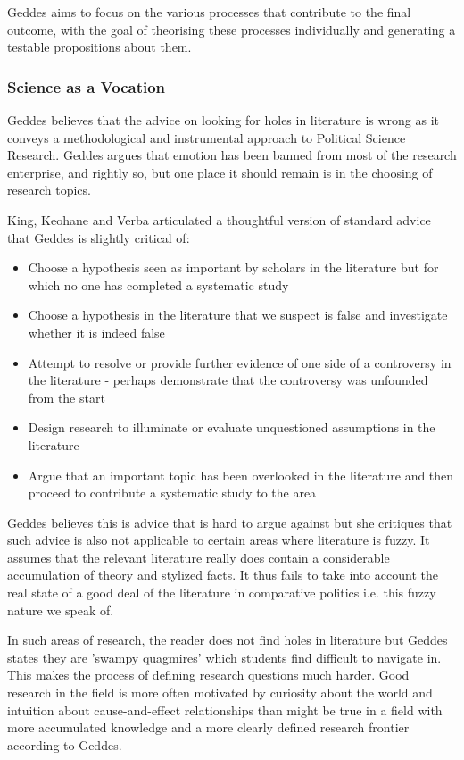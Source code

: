 \documentclass[12pt, letterpaper]{article}
\begin{document}
{\vspace{10pt}
\noindent Geddes aims to focus on the various processes that contribute to the final outcome, with the goal of theorising these processes individually and generating a testable propositions about them.

\subsubsection{Science as a Vocation}
Geddes believes that the advice on looking for holes in literature is wrong as it conveys a methodological and instrumental approach to Political Science Research. Geddes argues that emotion has been banned from most of the research enterprise, and rightly so, but one place it should remain is in the choosing of research topics.

\vspace{10pt}
\noindent King, Keohane and Verba articulated a thoughtful version of standard advice that Geddes is slightly critical of:
\begin{itemize}
	\item Choose a hypothesis seen as important by scholars in the literature but for which no one has completed a systematic study
	\item Choose a hypothesis in the literature that we suspect is false and investigate whether it is indeed false
	\item Attempt to resolve or provide further evidence of one side of a controversy in the literature - perhaps demonstrate that the controversy was unfounded from the start
	\item Design research to illuminate or evaluate unquestioned assumptions in the literature
	\item Argue that an important topic has been overlooked in the literature and then proceed to contribute a systematic study to the area
\end{itemize}
Geddes believes this is advice that is hard to argue against but she critiques that such advice is also not applicable to certain areas where literature is fuzzy. It assumes that the relevant literature really does contain a considerable accumulation of theory and stylized facts. It thus fails to take into account the real state of a good deal of the literature in comparative politics i.e. this fuzzy nature we speak of.

\vspace{10pt}
\noindent In such areas of research, the reader does not find holes in literature but Geddes states they are 'swampy quagmires' which students find difficult to navigate in. This makes the process of defining research questions much harder. Good research in the field is more often motivated by curiosity about the world and intuition about cause-and-effect relationships than might be true in a field with more accumulated knowledge and a more clearly defined research frontier according to Geddes.

}
\end{document}
